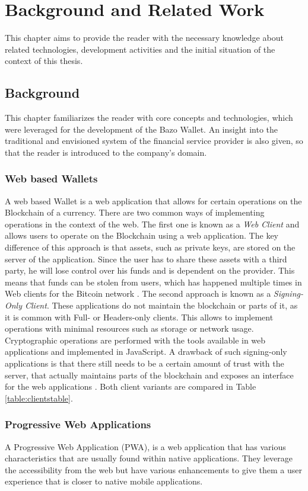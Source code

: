 \chapter{Background and Related Work}
This chapter aims to provide the reader with the necessary knowledge about related technologies, development activities and the initial situation of the context of this thesis.
\section{Background}
This chapter familiarizes the reader with core concepts and technologies, which were leveraged for the development of the Bazo Wallet. An insight into the traditional and envisioned system of the financial service provider is also given, so that the reader is introduced to the company's domain.

\subsection{Web based Wallets}
A web based Wallet is a web application that allows for certain operations on the Blockchain of a currency. There are two common ways of implementing operations in the context of the web.
The first one is known as a \textit{Web Client} and allows users to operate on the Blockchain using a web application. The key difference of this approach is that assets, such as private keys, are stored on the server of the application. Since the user has to share these assets with a third party, he will lose control over his funds and is dependent on the provider. This means that funds can be stolen from users, which has happened multiple times in Web clients for the Bitcoin network \cite{masteringbitcoin}.
The second approach is known as a \textit{Signing-Only Client}. These applications do not maintain the blockchain or parts of it, as it is common with Full- or Headers-only clients. This allows to implement operations with minimal resources such as storage or network usage. Cryptographic operations are performed with the tools available in web applications and implemented in JavaScript.
A drawback of such signing-only applications is that there still needs to be a certain amount of trust with the server, that actually maintains parts of the blockchain and exposes an interface for the web applications \cite{bitcoinclients}.
Both client variants are compared in Table \ref{table:clientstable}.
\subsection{Progressive Web Applications}\label{pwacharacteristics}
A Progressive Web Application (PWA), is a web application that has various characteristics that are usually found within native applications.
They leverage the accessibility from the web but have various enhancements to give them a user experience that is closer to native mobile applications.

